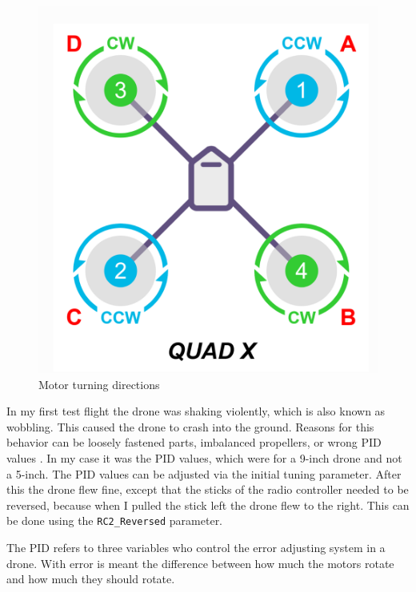 \documentclass[svgnames]{article}
\begin{document}
\begin{figure}[ht]
	\centering
	\includegraphics[scale=0.4]{pictures/quadx}
	\caption{Motor turning directions}
	\label{fig:quadx}
\end{figure}
	In my first test flight the drone was shaking violently, which is also known as wobbling. This caused the drone to crash  into the ground. Reasons for this behavior can be loosely fastened parts, imbalanced propellers, or wrong \gls{PID} values \cite{dronewobblevideo}. In my case it was the \gls{PID} values, which were for a 9-inch drone and not a 5-inch. The \gls{PID} values can be adjusted via the initial tuning parameter. After this the drone flew fine, except that the sticks of the radio controller needed to be reversed, because when I pulled the stick left the drone flew to the right. This can be done using the \lstinline|RC2_Reversed| parameter.

	\begin{Explanation}
		\item The \gls{PID} refers to three variables who control the error adjusting system in a drone. With error is meant the difference between how much the motors rotate and how much they should rotate. 
	\end{Explanation}
	
\end{document}

